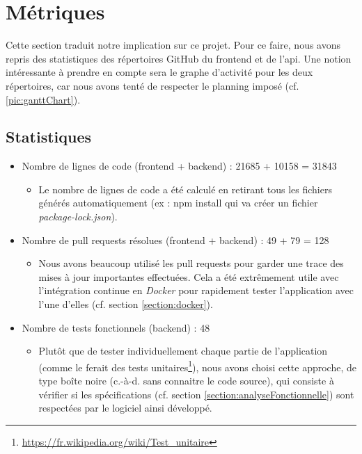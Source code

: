 \section{Métriques}
\label{section:codeMetrics}

Cette section traduit notre implication sur ce projet. 
Pour ce faire, nous avons repris des statistiques des répertoires GitHub du \gls{frontend} et de l'\gls{api}. 
Une notion intéressante à prendre en compte sera le graphe d'activité pour les deux répertoires, car nous avons tenté de respecter le planning imposé (cf. \ref{pic:ganttChart}).

\subsection{Statistiques}

\begin{itemize}[nosep,noitemsep,topsep=0pt,partopsep=0pt,after=\vspace*{2pt}]
    \item Nombre de lignes de code (\gls{frontend} + \gls{backend}) : 21685 + 10158 = 31843
    \begin{itemize}
        \item Le nombre de lignes de code a été calculé en retirant tous les fichiers générés automatiquement (ex : npm install qui va créer un fichier \textit{package-lock.json}).
    \end{itemize}
    \item Nombre de pull requests résolues (\gls{frontend} + \gls{backend}) : 49 + 79 = 128
    \begin{itemize}
        \item Nous avons beaucoup utilisé les pull requests pour garder une trace des mises à jour importantes effectuées. Cela a été extrêmement utile avec l'intégration continue en \textit{Docker} pour rapidement tester l'application avec l'une d'elles (cf. section \ref{section:docker}).
    \end{itemize}
    \item Nombre de tests fonctionnels (\gls{backend}) : 48
    \begin{itemize}
        \item Plutôt que de tester individuellement chaque partie de l'application (comme le ferait des tests 
        unitaires\footnote{
            \href{https://fr.wikipedia.org/wiki/Test\_unitaire}{https://fr.wikipedia.org/wiki/Test\_unitaire}
        }), nous avons choisi cette approche, de type boîte noire (c.-à-d. sans connaitre le code source), qui consiste à vérifier si les spécifications (cf. section \ref{section:analyseFonctionnelle}) sont respectées par le logiciel ainsi développé.

\end{itemize}
\end{itemize}
